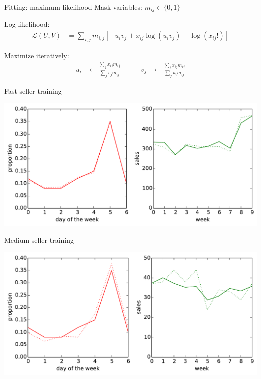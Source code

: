\documentclass{beamer}
\begin{document}
\begin{frame}{Fitting: maximum likelihood}
 Mask variables: $m_{ij} \in \{0,1\}$
 \vspace{0.5cm}
 
 Log-likelihood:
 \begin{align}
  \mathcal{L}(U,V) &= \sum_{i,j} m_{i,j} \left[ -u_i v_j + x_{ij}\log(u_i v_j) - \log(x_{ij}!) \right]
 \end{align}
 
 Maximize iteratively:
 \begin{align}
  u_i &\leftarrow \frac{\sum_j x_{ij} m_{ij}}{\sum_j v_{j} m_{ij}} & \qquad v_j &\leftarrow \frac{\sum_i x_{ij} m_{ij}}{\sum_j u_{i} m_{ij}}
 \end{align}
\end{frame}

\begin{frame}{Fast seller training}
  \begin{center}
  \includegraphics[width=0.8\columnwidth]{fast_learning.pdf}
 \end{center}
\end{frame}

\begin{frame}{Medium seller training}
  \begin{center}
  \includegraphics[width=0.8\columnwidth]{medium_learning.pdf}
 \end{center}
\end{frame}
\end{document}

